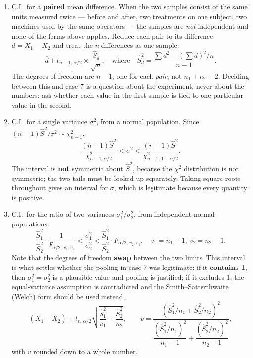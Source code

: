 \documentclass[11pt,a4paper]{article}
\theoremstyle{definition}
\begin{document}
\begin{enumerate}
\item C.I.\ for a \textbf{paired} mean difference. When the two samples consist of the same
units measured twice --- before and after, two treatments on one subject, two machines used
by the same operators --- the samples are \emph{not} independent and none of the forms above
applies. Reduce each pair to its difference $d=X_1-X_2$ and treat the $n$ differences as one
sample:
\[\overline{d}\pm t_{n-1,\,\alpha/2}\times \frac{\hat{S}_d}{\sqrt{n}},
\quad \text{where}\quad 
\hat{S}^2_d=\frac{\sum d^2-(\sum d)^2/n}{n-1}.\]
The degrees of freedom are $n-1$, one for each \emph{pair}, not $n_1+n_2-2$. Deciding
between this and case 7 is a question about the experiment, never about the numbers: ask
whether each value in the first sample is tied to one particular value in the second.

\item C.I.\ for a single variance $\sigma^2$, from a normal population. Since
$(n-1)\hat{S}^2/\sigma^2\sim\chi^2_{n-1}$,
\[\frac{(n-1)\hat{S}^2}{\chi^2_{n-1,\,\alpha/2}}<\sigma^2<
\frac{(n-1)\hat{S}^2}{\chi^2_{n-1,\,1-\alpha/2}}.\]
The interval is \textbf{not} symmetric about $\hat{S}^2$, because the $\chi^2$ distribution
is not symmetric; the two tails must be looked up separately. Taking square roots throughout
gives an interval for $\sigma$, which is legitimate because every quantity is positive.

\item C.I.\ for the ratio of two variances $\sigma_1^2/\sigma_2^2$, from independent normal
populations:
\[\frac{\hat{S}_1^2}{\hat{S}_2^2}\cdot\frac{1}{F_{\alpha/2,\,v_1,v_2}}
<\frac{\sigma_1^2}{\sigma_2^2}<
\frac{\hat{S}_1^2}{\hat{S}_2^2}\cdot F_{\alpha/2,\,v_2,v_1},
\quad v_1=n_1-1,\ v_2=n_2-1.\]
Note that the degrees of freedom \textbf{swap} between the two limits. This interval is what
settles whether the pooling in case 7 was legitimate: if it \textbf{contains 1}, then
$\sigma_1^2=\sigma_2^2$ is a plausible value and pooling is justified; if it excludes 1, the
equal-variance assumption is contradicted and the Smith--Satterthwaite (Welch) form should be
used instead,
\[(\overline{X}_1-\overline{X}_2)\pm t_{v,\,\alpha/2}
\sqrt{\frac{\hat{S}_1^2}{n_1}+\frac{\hat{S}_2^2}{n_2}},\qquad
v=\frac{\left(\hat{S}_1^2/n_1+\hat{S}_2^2/n_2\right)^2}
{\dfrac{(\hat{S}_1^2/n_1)^2}{n_1-1}+\dfrac{(\hat{S}_2^2/n_2)^2}{n_2-1}},\]
with $v$ rounded down to a whole number.
\end{enumerate}
\end{document}
